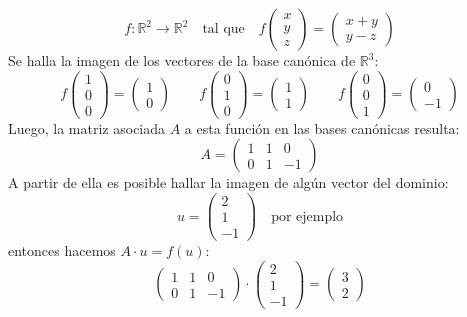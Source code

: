 \[
f:\mathbb{R}^2 \rightarrow \mathbb{R}^2 \quad \text{tal que} \quad f\begin{pmatrix}
  x \\ y \\ z
\end{pmatrix} = \begin{pmatrix}
  x+y \\ y-z
\end{pmatrix}
\]
Se halla la imagen de los vectores de la base canónica de \(\mathbb{R}^3\):
\[
f\begin{pmatrix}
  1 \\ 0 \\ 0 
\end{pmatrix} = \begin{pmatrix}
  1 \\ 0
\end{pmatrix} \qquad f\begin{pmatrix}
  0 \\ 1 \\ 0
\end{pmatrix} = \begin{pmatrix}
  1 \\ 1
\end{pmatrix} \qquad f \begin{pmatrix}
  0 \\ 0 \\ 1
\end{pmatrix} = \begin{pmatrix}
  0 \\ -1
\end{pmatrix}
\]
Luego, la matriz asociada \(A\) a esta función en las bases canónicas resulta:
\[
A = \begin{pmatrix}
  1 & 1 & 0 \\
  0 & 1 & -1
\end{pmatrix}
\] 
A partir de ella es posible hallar la imagen de algún vector del dominio:
\[
u = \begin{pmatrix}
  2 \\ 1 \\ -1
\end{pmatrix} \quad \text{por ejemplo}
\]
entonces hacemos \(A\cdot u = f(u)\):
\[
\begin{pmatrix}
  1 & 1 & 0 \\
  0 & 1 & -1
\end{pmatrix} \cdot \begin{pmatrix}
  2 \\ 1 \\ -1
\end{pmatrix} = \begin{pmatrix}
  3 \\ 2
\end{pmatrix}
\]

